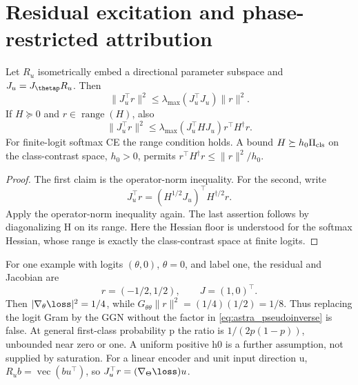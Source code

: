 \section{Residual excitation and phase-restricted attribution}
\label{sec:astra_excitation}
\begin{lemma}
\label{lem:astra_direction_gain}
Let $R_u$ isometrically embed a directional parameter subspace and
$J_u=J_\thetap R_u$. Then
\[
 \|J_u^\top r\|^2\le\lambda_{\max}(J_u^\top J_u)\|r\|^2.
\]
If $H\succeq0$ and $r\in\operatorname{range}(H)$, also
\begin{equation}\label{eq:astra_pseudoinverse}
 \|J_u^\top r\|^2\le\lambda_{\max}(J_u^\top HJ_u)r^\top H^\dagger r.
\end{equation}
For finite-logit softmax CE the range condition holds. A bound
$H\succeq h_0\Pi_{\rm cls}$ on the class-contrast space, $h_0>0$,
permits $r^\top H^\dagger r\le\|r\|^2/h_0$.
\end{lemma}
\begin{proof}
The first claim is the operator-norm inequality. For the second, write
\[J_u^\top r=(H^{1/2}J_u)^\top H^{\dagger/2}r.\]
Apply the operator-norm inequality again.
The last assertion follows by diagonalizing H on its range.
Here the Hessian floor is understood for the softmax Hessian, whose
range is exactly the class-contrast space at finite logits.
\end{proof}
\begin{remark}
For one example with logits $(\theta,0)$, $\theta=0$, and label one, the residual and Jacobian are
\[r=(-1/2,1/2),\qquad J=(1,0)^\top.\]
Then
$|\nabla_\theta\loss|^2=1/4$, while
$G_{\theta\theta}\|r\|^2=(1/4)(1/2)=1/8$.
Thus replacing the logit Gram by the GGN without the factor in
\eqref{eq:astra_pseudoinverse} is false. At general first-class probability
p the ratio is $1/(2p(1-p))$, unbounded near zero or one.
A uniform positive h0 is a further assumption, not supplied by
saturation. For a linear encoder and unit input direction u,
$R_u b=\operatorname{vec}(bu^\top)$, so $J_u^\top r=(\nabla_\Theta\loss)u$.
\end{remark}

